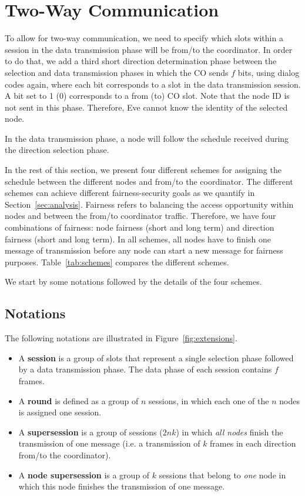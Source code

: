 \documentclass[10pt,letterpaper,conference]{IEEEtran}
\begin{document}
\section{Two-Way Communication}
\label{sec:extended}
To allow for two-way communication, we need to specify which slots within a
session in the data transmission phase will be from/to the coordinator. In order
to do that, we add a third short direction determination phase between the
selection and data transmission phases in which the CO sends $f$ bits, using dialog codes again,
where each bit corresponds to a slot in the data transmission session. A bit set to 1 (0) corresponds to a from (to) CO slot. Note that the node ID is not sent in this phase. Therefore, Eve cannot
know the identity of the selected node.

In the data transmission phase, a node will follow the schedule received during
the direction selection phase.

In the rest of this section, we present four different schemes for assigning the
schedule between the different nodes and from/to the coordinator. The different
schemes can achieve different fairness-security goals as we quantify in
Section~\ref{sec:analysis}. Fairness refers to balancing the access opportunity
within nodes and between the from/to coordinator traffic. Therefore, we have
four combinations of fairness: node fairness (short and long term) and direction
fairness (short and long term). In all schemes, all nodes have to finish one
message of transmission before any node can start a new message for fairness purposes.
Table~\ref{tab:schemes} compares the different schemes.

We start by some notations followed by the details of the four schemes.

\subsection{Notations}
The following notations are illustrated in Figure~\ref{fig:extensions}.
\begin{itemize}
  \item A \textbf{session} is a group of slots that represent a single selection
phase followed by a data transmission phase. The data phase of each session
contains $f$ frames.

  \item A \textbf{round} is defined as a group of $n$ sessions, in which each one of the $n$ nodes is
assigned one session.

  \item A \textbf{supersession} is a group of sessions ($2nk$) in which \emph{all nodes}
finish the transmission of one message (i.e. a transmission of $k$ frames in each direction from/to the coordinator).

  \item A \textbf{node supersession} is a group of $k$ sessions that belong to \emph{one}
node in which this node finishes the transmission of one message.

\end{itemize}
\end{document}
